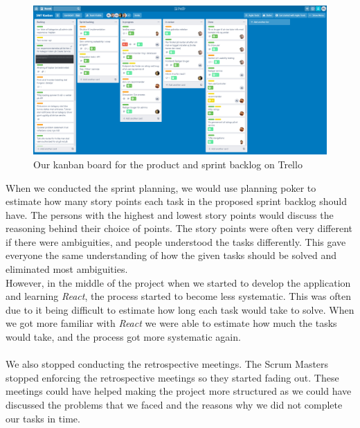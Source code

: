 \begin{figure}[H]
    \centering
    \includegraphics[width=0.8\linewidth]{figures/trellopicture.PNG}
    \caption{Our kanban board for the product and sprint backlog on Trello}
    \label{fig:trello-kanban}
\end{figure}
\noindent
When we conducted the sprint planning, we would use planning poker to estimate how many story points each task in the proposed sprint backlog should have.
The persons with the highest and lowest story points would discuss the reasoning behind their choice of points.
The story points were often very different if there were ambiguities, and people understood the tasks differently.
This gave everyone the same understanding of how the given tasks should be solved and eliminated most ambiguities. 
\\
However, in the middle of the project when we started to develop the application and learning \textit{React}, the process started to become less systematic.
This was often due to it being difficult to estimate how long each task would take to solve.
When we got more familiar with \textit{React} we were able to estimate how much the tasks would take, and the process got more systematic again.
\\\\
We also stopped conducting the retrospective meetings.
The Scrum Masters stopped enforcing the retrospective meetings so they started fading out.
These meetings could have helped making the project more structured as we could have discussed the problems that we faced and the reasons why we did not complete our tasks in time.

